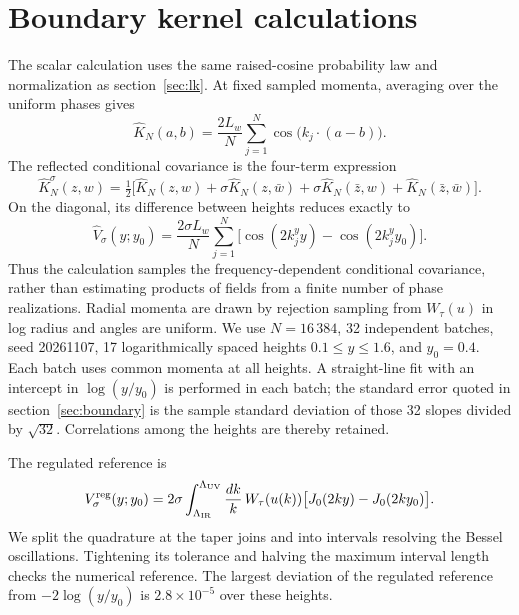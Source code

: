 \section{Boundary kernel calculations}
\label{app:boundary-methods}

The scalar calculation uses the same raised-cosine probability law and
normalization as section~\ref{sec:lk}.  At fixed sampled momenta, averaging
over the uniform phases gives
\begin{equation}
\widehat K_N(a,b)=\frac{2L_w}{N}\sum_{j=1}^N
\cos\bigl(k_j\cdot(a-b)\bigr).
\end{equation}
The reflected conditional covariance is the four-term expression
\begin{equation}
\widehat K_N^\sigma(z,w)=\tfrac12\bigl[
\widehat K_N(z,w)+\sigma\widehat K_N(z,\bar w)
+\sigma\widehat K_N(\bar z,w)+\widehat K_N(\bar z,\bar w)\bigr].
\label{eq:boundary-four-term-covariance}
\end{equation}
On the diagonal, its difference between heights reduces exactly to
\begin{equation}
\widehat V_\sigma(y;y_0)=\frac{2\sigma L_w}{N}\sum_{j=1}^N
\bigl[\cos(2k_j^y y)-\cos(2k_j^y y_0)\bigr].
\label{eq:boundary-feature-estimator}
\end{equation}
Thus the calculation samples the frequency-dependent conditional
covariance, rather than estimating products of fields from a finite
number of phase realizations.  Radial momenta are drawn by rejection
sampling from $W_\tau(u)$ in log radius and angles are uniform.  We use
$N=16\,384$, 32 independent batches, seed 20261107, 17 logarithmically
spaced heights $0.1\le y\le1.6$, and $y_0=0.4$.  Each batch uses common
momenta at all heights.  A straight-line fit with an intercept in
$\log(y/y_0)$ is performed in each batch; the standard error quoted in
section~\ref{sec:boundary} is the sample standard deviation of those 32
slopes divided by $\sqrt{32}$.  Correlations among the heights are thereby
retained.

The regulated reference is
\begin{equation}
V_\sigma^{\rm reg}(y;y_0)=2\sigma\int_{\Lambda_{\rm IR}}^{\Lambda_{\rm UV}}
\frac{dk}{k}\,W_\tau(u(k))
\bigl[J_0(2ky)-J_0(2ky_0)\bigr].
\end{equation}
We split the quadrature at the taper joins and into intervals resolving
the Bessel oscillations.  Tightening its tolerance and halving the maximum
interval length checks the numerical reference.  The largest deviation of
the regulated reference from $-2\log(y/y_0)$ is $2.8\times10^{-5}$
over these heights.


